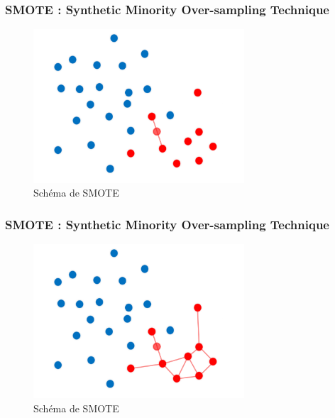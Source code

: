 \documentclass{beamer}
\begin{document}
  \begin{frame}
      \frametitle{SMOTE : Synthetic Minority Over-sampling Technique}

      \begin{figure}
          \centering
          \includegraphics[width=0.7\textwidth]{images/SMOTEC.png}
          \caption{Schéma de SMOTE}
      \end{figure}

  \end{frame}

  \begin{frame}
      \frametitle{SMOTE : Synthetic Minority Over-sampling Technique}



      \begin{figure}
          \centering
          \includegraphics[width=0.7\textwidth]{images/SMOTEB.png}
          \caption{Schéma de SMOTE}
      \end{figure}

  \end{frame}
\end{document}
